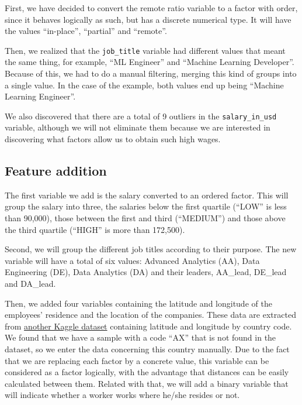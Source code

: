 \documentclass[
]{article}
\begin{document}
First, we have decided to convert the remote ratio variable to a factor
with order, since it behaves logically as such, but has a discrete
numerical type. It will have the values ``in-place'', ``partial'' and
``remote''.

Then, we realized that the \texttt{job\_title} variable had different
values that meant the same thing, for example, ``ML Engineer'' and
``Machine Learning Developer''. Because of this, we had to do a manual
filtering, merging this kind of groups into a single value. In the case
of the example, both values end up being ``Machine Learning Engineer''.

We also discovered that there are a total of 9 outliers in the
\texttt{salary\_in\_usd} variable, although we will not eliminate them
because we are interested in discovering what factors allow us to obtain
such high wages.

\hypertarget{feature-addition}{%
\subsection{Feature addition}\label{feature-addition}}

The first variable we add is the salary converted to an ordered factor.
This will group the salary into three, the salaries below the first
quartile (``LOW'' is less than 90,000), those between the first and
third (``MEDIUM'') and those above the third quartile (``HIGH'' is more
than 172,500).

Second, we will group the different job titles according to their
purpose. The new variable will have a total of six values: Advanced
Analytics (AA), Data Engineering (DE), Data Analytics (DA) and their
leaders, AA\_lead, DE\_lead and DA\_lead.

Then, we added four variables containing the latitude and longitude of
the employees' residence and the location of the companies. These data
are extracted from
\href{https://www.kaggle.com/datasets/paultimothymooney/latitude-and-longitude-for-every-country-and-state}{another
Kaggle dataset} containing latitude and longitude by country code. We
found that we have a sample with a code ``AX'' that is not found in the
dataset, so we enter the data concerning this country manually. Due to
the fact that we are replacing each factor by a concrete value, this
variable can be considered as a factor logically, with the advantage
that distances can be easily calculated between them. Related with that,
we will add a binary variable that will indicate whether a worker works
where he/she resides or not.
\end{document}
